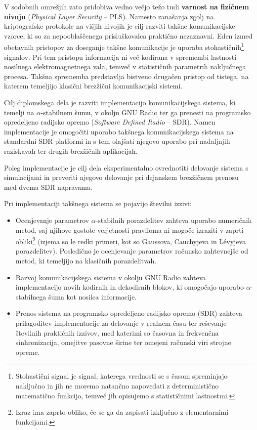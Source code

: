 \documentclass[a4paper, 12pt, openany]{book}
\begin{document}
V sodobnih omrežjih zato pridobiva vedno večjo težo tudi \textbf{varnost na fizičnem nivoju} \cite{lutovac2025physical} (\textit{Physical Layer Security} – PLS). Namesto zanašanja zgolj na kriptografske protokole na višjih nivojih je cilj razviti takšne komunikacijske vzorce, ki so za nepooblaščenega prisluškovalca praktično nezaznavni. Eden izmed obetavnih pristopov za doseganje takšne komunikacije je uporaba stohastičnih\footnote{Stohastični signal je signal, katerega vrednosti se s časom spreminjajo naključno in jih ne moremo natančno napovedati z deterministično matematično funkcijo, temveč jih opisujemo s statističnimi lastnostmi.} signalov. Pri tem pristopu informacija ni več kodirana v spremembi lastnosti nosilnega elektromagnetnega vala, temveč v statističnih parametrih naključnega procesa. Takšna sprememba predstavlja bistveno drugačen pristop od tistega, na katerem temeljijo klasični brezžični komunikacijski sistemi.

Cilj diplomskega dela je razviti implementacijo komunikacijskega sistema, ki temelji na $\alpha$-stabilnem šumu, v okolju GNU Radio ter ga prenesti na programsko opredeljeno radijsko opremo (\textit{Software Defined Radio} -- SDR). Namen implementacije je omogočiti uporabo takšnega komunikacijskega sistema na standardni SDR platformi in s tem olajšati njegovo uporabo pri nadaljnjih raziskavah ter drugih brezžičnih aplikacijah.

Poleg implementacije je cilj dela eksperimentalno ovrednotiti delovanje sistema s simulacijami in preveriti njegovo delovanje pri dejanskem brezžičnem prenosu med dvema SDR napravama.

Pri implementaciji takšnega sistema se pojavijo številni izzivi:

\begin{itemize}
	 \item Ocenjevanje parametrov $\alpha$-stabilnih porazdelitev zahteva uporabo numeričnih metod, saj njihove gostote verjetnosti praviloma ni mogoče izraziti v zaprti obliki\footnote{Izraz ima zaprto obliko, če se ga da zapisati izključno z elementarnimi funkcijami.} (izjema so le redki primeri, kot so Gaussova, Cauchyjeva in Lévyjeva porazdelitev). Posledično je ocenjevanje parametrov računsko zahtevnejše od metod, ki temeljijo na klasičnih porazdelitvah.

    \item Razvoj komunikacijskega sistema v okolju GNU Radio zahteva implementacijo novih kodirnih in dekodirnih blokov, ki omogočajo uporabo $\alpha$-stabilnega šuma kot nosilca informacije.

    \item Prenos sistema na programsko opredeljeno radijsko opremo (SDR) zahteva prilagoditev implementacije za delovanje v realnem času ter reševanje številnih praktičnih izzivov, med katerimi so časovna in frekvenčna sinhronizacija, omejitve pasovne širine ter omejeni računski viri strojne opreme.
\end{itemize}
\end{document}
